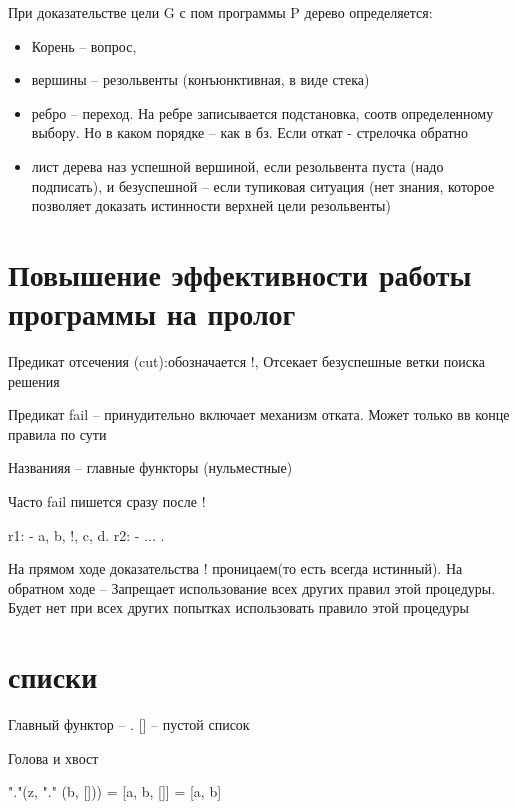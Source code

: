 \documentclass[12pt]{report}
\begin{document}
При доказательстве цели G с пом программы P дерево определяется: 

\begin{itemize}
\item  Корень -- вопрос, 
\item  вершины -- резольвенты (конъюнктивная, в виде стека)
\item  ребро -- переход. На ребре записывается подстановка, соотв определенному выбору. Но в каком порядке -- как в бз. Если откат - стрелочка обратно
\item  лист дерева наз успешной вершиной, если резольвента пуста (надо подписать), и безуспешной -- если тупиковая ситуация (нет знания, которое позволяет доказать истинности верхней цели резольвенты)
\end{itemize}

\section{Повышение эффективности работы программы на пролог}

Предикат отсечения (cut):обозначается !,  Отсекает безуспешные ветки поиска решения

Предикат fail  --  принудительно включает механизм отката. Может только вв конце правила по сути


Названияя -- главные функторы (нульместные)

Часто fail пишется сразу после !

r1: - a, b, !, c, d.
r2: - ... .

На прямом ходе доказательства ! проницаем(то есть всегда истинный). На обратном ходе -- Запрещает использование всех других правил этой процедуры. Будет нет при всех других попытках использовать правило этой процедуры


\section{списки}

Главный функтор -- . [] -- пустой список

Голова и хвост

"."(z, "." (b, []))  =  [a, b, []] = [a, b]
\end{document}

